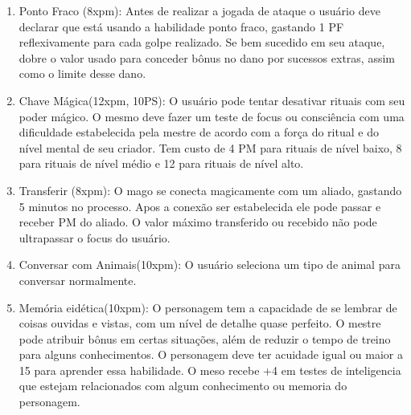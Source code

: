 \begin{enumerate}
	\item Ponto Fraco (8xpm): Antes de realizar a jogada de ataque o usuário deve declarar que está usando a habilidade ponto fraco, gastando 1 PF reflexivamente para cada golpe realizado. Se bem sucedido em seu ataque, dobre o valor usado para conceder bônus no dano por sucessos extras, assim como o limite desse dano.
	
	\item  Chave Mágica(12xpm, 10PS): O usuário pode tentar desativar rituais com seu poder mágico. O mesmo deve fazer um teste de focus ou consciência com uma dificuldade estabelecida pela mestre de acordo com a força do ritual e do nível mental de seu criador. Tem custo de 4 PM para rituais de nível baixo, 8 para rituais de nível médio e 12 para rituais de nível alto.
	
	\item Transferir (8xpm): O mago se conecta magicamente com um aliado, gastando 5 minutos no processo. Apos a conexão ser estabelecida ele pode passar e receber PM do aliado. O valor máximo transferido ou recebido não pode ultrapassar o focus do usuário.

 	\item Conversar com Animais(10xpm): O usuário seleciona um tipo de animal para conversar normalmente. 

	\item Memória eidética(10xpm): O personagem tem a capacidade de se lembrar de coisas ouvidas e vistas, com um nível de detalhe quase perfeito. O mestre pode atribuir bônus em certas situações, além de reduzir o tempo de treino para alguns conhecimentos. O personagem deve ter acuidade igual ou maior a 15 para aprender essa habilidade. O meso recebe +4 em testes de inteligencia que estejam relacionados com algum conhecimento ou memoria do personagem.

	
	

\end{enumerate}
